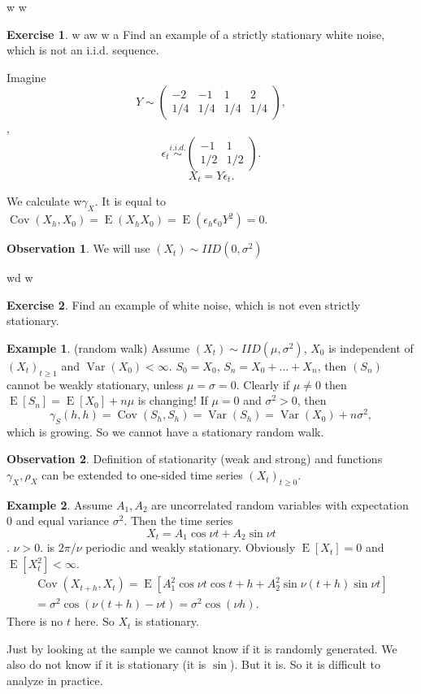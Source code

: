 \documentclass[12pt,a4paper, notitlepage]{book}
\theoremstyle{definition} %
\newtheorem{example}{Example}[chapter]
\newtheorem{exercise}{Exercise}[chapter]
\newtheorem*{observation}{Observation}
\theoremstyle{plain} %
\DeclareMathOperator{\Var}{Var}
\DeclareMathOperator{\Cov}{Cov}
\DeclareMathOperator{\E}{E}
\begin{document}
w w
\begin{exercise}w              aw              w a
Find an example of a strictly stationary white noise, which is not an i.i.d. sequence.
\end{exercise}
\begin{hint} Imagine 
\[ Y \sim \left( \begin{array}{cccc} -2 & -1 & 1 & 2 \\  1/4 &1/4 & 1/4 &1/4 \end{array} \right) , \]
, \[ \epsilon_t  \overset{i.i.d.}{\sim}  \left( \begin{array}{cc} -1& 1 \\ 1/2 &1/2 \end{array} \right) . \]
 \[ X_t = Y \epsilon_t . \]


 We calculate 
w$ \gamma_X$. It is equal to $ \Cov(X_h, X_0) = \E(X_h X_0) = \E(\epsilon_h \epsilon_0 Y^2) = 0$.
\end{hint}

\begin{observation} We will use $(X_t) \sim IID(0, \sigma^2)$ \end{observation}
wd            w    
\begin{exercise}
Find an example of white noise, which is not even strictly stationary.
\end{exercise}

\begin{example} (random walk)
Assume $(X_t) \sim IID(\mu, \sigma^2)$, $X_0$ is independent of $(X_t)_{t \geq 1}$ and $ \Var(X_0) < \infty$.
$ S_0 = X_0$, $S_n = X_0 + \dots + X_n$, then $(S_n)$ cannot be weakly stationary, unless $ \mu = \sigma = 0 $.
Clearly if $\mu \neq 0$ then $ \E[S_n] = \E[X_0] + n\mu$ is changing!
If $\mu = 0$ and $\sigma^2 > 0$, then 
\[ \gamma_S(h,h) = \Cov(S_h, S_h) = \Var(S_h) = \Var(X_0) + n \sigma^2, \]
 which is growing. So we cannot have a stationary random walk.
\end{example}

\begin{observation}
Definition of stationarity (weak and strong) and functions $\gamma_X, \rho_X$ can be extended to one-sided time series $(X_t)_ {t\geq 0}$. 
\end{observation}


\begin{example}
Assume $A_1, A_2$ are uncorrelated random variables with expectation $0$ and equal variance $\sigma^2$. Then the time series 
\[ X_t = A_1 \cos{\nu t} +A_2 \sin{\nu t} \] . $\nu > 0$.
is $2 \pi / \nu$ periodic and weakly stationary.
Obviously $ \E[X_t] = 0$ and $\E[X_t^2] < \infty$.
\begin{align*} \Cov(X_{t+h}, X_t)  = \E[ A_1^2 \cos{\nu t}\cos{t + h} + A_2^2 \sin{\nu(t + h)}\sin{\nu t} ] \\
= \sigma^2 \cos(\nu (t + h) - \nu t) = \sigma^2 \cos(\nu h). \end{align*}
There is no $t$ here. So $X_t$ is stationary. 

Just by looking at the sample we cannot know if it is randomly generated. We also do not know if it is stationary (it is $\sin$).
But it is. So it is difficult to analyze in practice.
\end{example}
\end{document}
